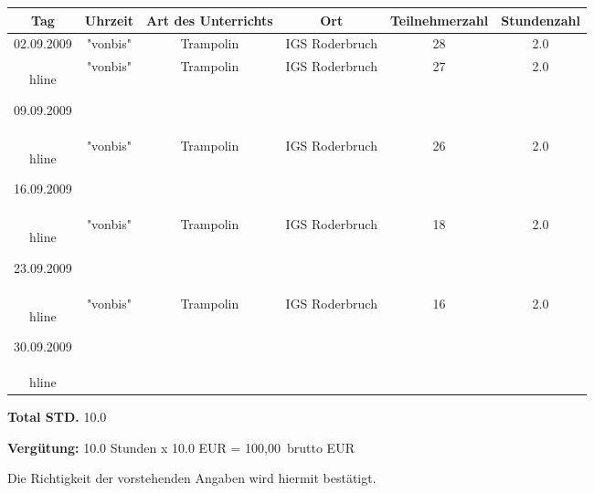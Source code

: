 \documentclass[a4paper,10pt,BCOR=0mm]{scrreprt}
\begin{document}
\begin{flushright}
\begin{tabular}{|c|c|c|c|c|c|}\hline
 \textbf{Tag}
&
 \textbf{Uhrzeit}
&
 \textbf{Art des Unterrichts}
&
\textbf{Ort}
&
\textbf{Teilnehmerzahl}
&
 \textbf{Stundenzahl}\\\hline\hline

02.09.2009
&
"vonbis"
&
Trampolin
&
IGS Roderbruch
&
28
&
2.0
\\hline


09.09.2009
&
"vonbis"
&
Trampolin
&
IGS Roderbruch
&
27
&
2.0
\\hline


16.09.2009
&
"vonbis"
&
Trampolin
&
IGS Roderbruch
&
26
&
2.0
\\hline


23.09.2009
&
"vonbis"
&
Trampolin
&
IGS Roderbruch
&
18
&
2.0
\\hline


30.09.2009
&
"vonbis"
&
Trampolin
&
IGS Roderbruch
&
16
&
2.0
\\hline



\end{tabular} 
\begin{flushright}
\parbox{5cm}{\textbf{Total STD.} 10.0}\end{flushright}
\hfill\hfill \textbf{Vergütung:} 10.0 Stunden x 10.0 EUR = 100,00\officialeuro\  brutto EUR \hspace*{2cm}\\
\end{flushright}
\vfill
Die Richtigkeit der vorstehenden Angaben wird hiermit bestätigt.\\
\end{document}
